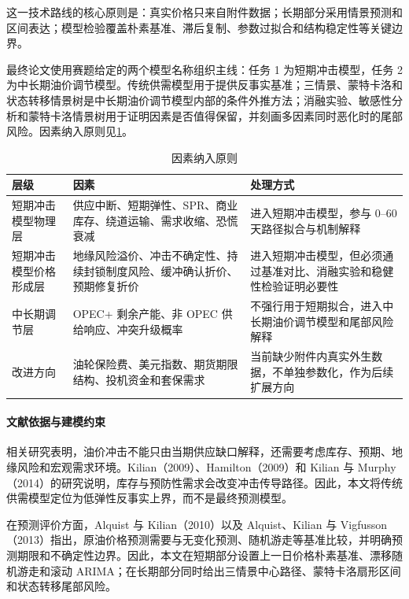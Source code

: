 这一技术路线的核心原则是：真实价格只来自附件数据；长期部分采用情景预测和区间表达；模型检验覆盖朴素基准、滞后复制、参数过拟合和结构稳定性等关键边界。

最终论文使用赛题给定的两个模型名称组织主线：任务 1 为短期冲击模型，任务 2 为中长期油价调节模型。传统供需模型用于提供反事实基准；三情景、蒙特卡洛和状态转移情景树是中长期油价调节模型内部的条件外推方法；消融实验、敏感性分析和蒙特卡洛情景树用于证明因素是否值得保留，并刻画多因素同时恶化时的尾部风险。因素纳入原则见\cref{tab:factor-inclusion}。

\begin{table}[!htbp]
\centering
\caption{因素纳入原则}
\label{tab:factor-inclusion}
\begin{tabularx}{\linewidth}{lX X}
\toprule
层级 & 因素 & 处理方式 \\
\midrule
短期冲击模型物理层 & 供应中断、短期弹性、SPR、商业库存、绕道运输、需求收缩、恐慌衰减 & 进入短期冲击模型，参与 0--60 天路径拟合与机制解释 \\
短期冲击模型价格形成层 & 地缘风险溢价、冲击不确定性、持续封锁制度风险、缓冲确认折价、预期修复折价 & 进入短期冲击模型，但必须通过基准对比、消融实验和稳健性检验证明必要性 \\
中长期调节层 & OPEC+ 剩余产能、非 OPEC 供给响应、冲突升级概率 & 不强行用于短期拟合，进入中长期油价调节模型和尾部风险解释 \\
改进方向 & 油轮保险费、美元指数、期货期限结构、投机资金和套保需求 & 当前缺少附件内真实外生数据，不单独参数化，作为后续扩展方向 \\
\bottomrule
\end{tabularx}
\end{table}


\paragraph{文献依据与建模约束}

相关研究表明，油价冲击不能只由当期供应缺口解释，还需要考虑库存、预期、地缘风险和宏观需求环境。Kilian（2009）、Hamilton（2009）和 Kilian 与 Murphy（2014）的研究说明，库存与预防性需求会改变冲击传导路径。因此，本文将传统供需模型定位为低弹性反事实上界，而不是最终预测模型。

在预测评价方面，Alquist 与 Kilian（2010）以及 Alquist、Kilian 与 Vigfusson（2013）指出，原油价格预测需要与无变化预测、随机游走等基准比较，并明确预测期限和不确定性边界。因此，本文在短期部分设置上一日价格朴素基准、漂移随机游走和滚动 ARIMA；在长期部分同时给出三情景中心路径、蒙特卡洛扇形区间和状态转移尾部风险。

